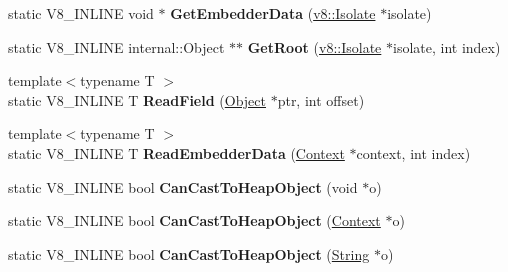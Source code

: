 \begin{DoxyCompactItemize}
\item 
\hypertarget{classv8_1_1internal_1_1_internals_a34497b8a0761f655a0789722100c06c7}{}static V8\+\_\+\+I\+N\+L\+I\+N\+E void $\ast$ {\bfseries Get\+Embedder\+Data} (\hyperlink{classv8_1_1_isolate}{v8\+::\+Isolate} $\ast$isolate)\label{classv8_1_1internal_1_1_internals_a34497b8a0761f655a0789722100c06c7}

\item 
\hypertarget{classv8_1_1internal_1_1_internals_aae733fd76f6f692f83a6ded4ac8f1571}{}static V8\+\_\+\+I\+N\+L\+I\+N\+E internal\+::\+Object $\ast$$\ast$ {\bfseries Get\+Root} (\hyperlink{classv8_1_1_isolate}{v8\+::\+Isolate} $\ast$isolate, int index)\label{classv8_1_1internal_1_1_internals_aae733fd76f6f692f83a6ded4ac8f1571}

\item 
\hypertarget{classv8_1_1internal_1_1_internals_a4f28cf2b35b038c62b1223c011bae218}{}{\footnotesize template$<$typename T $>$ }\\static V8\+\_\+\+I\+N\+L\+I\+N\+E T {\bfseries Read\+Field} (\hyperlink{classv8_1_1_object}{Object} $\ast$ptr, int offset)\label{classv8_1_1internal_1_1_internals_a4f28cf2b35b038c62b1223c011bae218}

\item 
\hypertarget{classv8_1_1internal_1_1_internals_a2e39d109347580ac762eb0eceeb75687}{}{\footnotesize template$<$typename T $>$ }\\static V8\+\_\+\+I\+N\+L\+I\+N\+E T {\bfseries Read\+Embedder\+Data} (\hyperlink{classv8_1_1_context}{Context} $\ast$context, int index)\label{classv8_1_1internal_1_1_internals_a2e39d109347580ac762eb0eceeb75687}

\item 
\hypertarget{classv8_1_1internal_1_1_internals_a3b15ad34f41f6db55d5a64a3f798a593}{}static V8\+\_\+\+I\+N\+L\+I\+N\+E bool {\bfseries Can\+Cast\+To\+Heap\+Object} (void $\ast$o)\label{classv8_1_1internal_1_1_internals_a3b15ad34f41f6db55d5a64a3f798a593}

\item 
\hypertarget{classv8_1_1internal_1_1_internals_a33864a5a7cde29ca8c6ddf32aff45a78}{}static V8\+\_\+\+I\+N\+L\+I\+N\+E bool {\bfseries Can\+Cast\+To\+Heap\+Object} (\hyperlink{classv8_1_1_context}{Context} $\ast$o)\label{classv8_1_1internal_1_1_internals_a33864a5a7cde29ca8c6ddf32aff45a78}

\item 
\hypertarget{classv8_1_1internal_1_1_internals_a893e76f30f934b44615fb428c8a1532d}{}static V8\+\_\+\+I\+N\+L\+I\+N\+E bool {\bfseries Can\+Cast\+To\+Heap\+Object} (\hyperlink{classv8_1_1_string}{String} $\ast$o)\label{classv8_1_1internal_1_1_internals_a893e76f30f934b44615fb428c8a1532d}


\end{DoxyCompactItemize}
